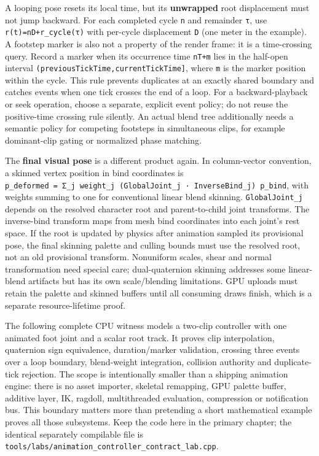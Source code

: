A looping pose resets its local time, but its \textbf{unwrapped} root displacement must not jump backward. For each completed cycle \texttt{n} and remainder \texttt{τ}, use \texttt{r(t)=nD+r\_cycle(τ)} with per-cycle displacement \texttt{D} (one meter in the example). A footstep marker is also not a property of the render frame: it is a time-crossing query. Record a marker when its occurrence time \texttt{nT+m} lies in the half-open interval \texttt{(previousTickTime,currentTickTime{]}}, where \texttt{m} is the marker position within the cycle. This rule prevents duplicates at an exactly shared boundary and catches events when one tick crosses the end of a loop. For a backward-playback or seek operation, choose a separate, explicit event policy; do not reuse the positive-time crossing rule silently. An actual blend tree additionally needs a semantic policy for competing footsteps in simultaneous clips, for example dominant-clip gating or normalized phase matching.

The \textbf{final visual pose} is a different product again. In column-vector convention, a skinned vertex position in bind coordinates is \texttt{p\_deformed\ =\ Σ\_j\ weight\_j\ (GlobalJoint\_j\ ·\ InverseBind\_j)\ p\_bind}, with weights summing to one for conventional linear blend skinning. \texttt{GlobalJoint\_j} depends on the resolved character root and parent-to-child joint transforms. The inverse-bind transform maps from mesh bind coordinates into each joint's rest space. If the root is updated by physics after animation sampled its provisional pose, the final skinning palette and culling bounds must use the resolved root, not an old provisional transform. Nonuniform scales, shear and normal transformation need special care; dual-quaternion skinning addresses some linear-blend artifacts but has its own scale/blending limitations. GPU uploads must retain the palette and skinned buffers until all consuming draws finish, which is a separate resource-lifetime proof.

The following complete CPU witness models a two-clip controller with one animated foot joint and a scalar root track. It proves clip interpolation, quaternion sign equivalence, duration/marker validation, crossing three events over a loop boundary, blend-weight integration, collision authority and duplicate-tick rejection. The scope is intentionally smaller than a shipping animation engine: there is no asset importer, skeletal remapping, GPU palette buffer, additive layer, IK, ragdoll, multithreaded evaluation, compression or notification bus. This boundary matters more than pretending a short mathematical example proves all those subsystems. Keep the code here in the primary chapter; the identical separately compilable file is \texttt{tools/labs/animation\_controller\_contract\_lab.cpp}.

